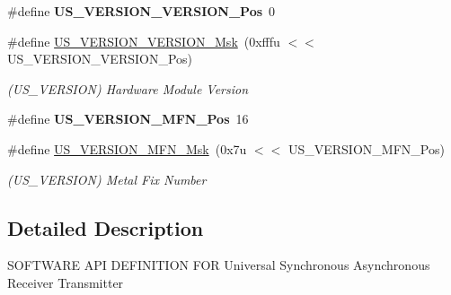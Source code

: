 \begin{DoxyCompactItemize}
\mbox{\label{group__SAMV71__USART_ga5c5fa0ed62a0dd8c29dd79e3a1906143}} 
\#define {\bfseries U\+S\+\_\+\+V\+E\+R\+S\+I\+O\+N\+\_\+\+V\+E\+R\+S\+I\+O\+N\+\_\+\+Pos}~0
\item 
\mbox{\label{group__SAMV71__USART_gab8dc7a3f4f7e97a0322059fdd7ad24be}} 
\#define \mbox{\hyperlink{group__SAMV71__USART_gab8dc7a3f4f7e97a0322059fdd7ad24be}{U\+S\+\_\+\+V\+E\+R\+S\+I\+O\+N\+\_\+\+V\+E\+R\+S\+I\+O\+N\+\_\+\+Msk}}~(0xfffu $<$$<$ U\+S\+\_\+\+V\+E\+R\+S\+I\+O\+N\+\_\+\+V\+E\+R\+S\+I\+O\+N\+\_\+\+Pos)
\begin{DoxyCompactList}\small\item\em (U\+S\+\_\+\+V\+E\+R\+S\+I\+ON) Hardware Module Version \end{DoxyCompactList}\item 
\mbox{\label{group__SAMV71__USART_gad829c0409e53259e1e010d028084448a}} 
\#define {\bfseries U\+S\+\_\+\+V\+E\+R\+S\+I\+O\+N\+\_\+\+M\+F\+N\+\_\+\+Pos}~16
\item 
\mbox{\label{group__SAMV71__USART_ga5a2b3a0dcc1241543c272f1af1862bd4}} 
\#define \mbox{\hyperlink{group__SAMV71__USART_ga5a2b3a0dcc1241543c272f1af1862bd4}{U\+S\+\_\+\+V\+E\+R\+S\+I\+O\+N\+\_\+\+M\+F\+N\+\_\+\+Msk}}~(0x7u $<$$<$ U\+S\+\_\+\+V\+E\+R\+S\+I\+O\+N\+\_\+\+M\+F\+N\+\_\+\+Pos)
\begin{DoxyCompactList}\small\item\em (U\+S\+\_\+\+V\+E\+R\+S\+I\+ON) Metal Fix Number \end{DoxyCompactList}\end{DoxyCompactItemize}


\subsection{Detailed Description}
S\+O\+F\+T\+W\+A\+RE A\+PI D\+E\+F\+I\+N\+I\+T\+I\+ON F\+OR Universal Synchronous Asynchronous Receiver Transmitter 